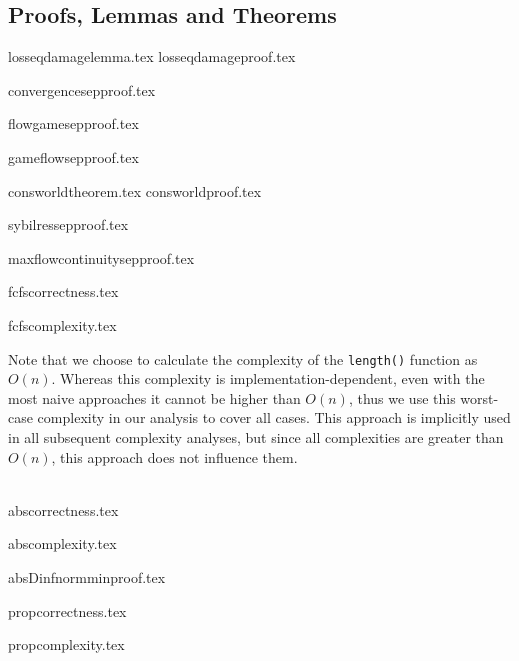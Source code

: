 \subsection{Proofs, Lemmas and Theorems}
{losseqdamagelemma.tex}
{losseqdamageproof.tex}

{convergencesepproof.tex}

{flowgamesepproof.tex}

{gameflowsepproof.tex}

{consworldtheorem.tex}
{consworldproof.tex}

{sybilressepproof.tex}

{maxflowcontinuitysepproof.tex}

{fcfscorrectness.tex}

{fcfscomplexity.tex}

Note that we choose to calculate the complexity of the \texttt{length()} function as $O\left(n\right)$. Whereas this
complexity is implementation-dependent, even with the most naive approaches it cannot be higher than $O\left(n\right)$,
thus we use this worst-case complexity in our analysis to cover all cases. This approach is implicitly used in all
subsequent complexity analyses, but since all complexities are greater than $O\left(n\right)$, this approach does not
influence them.

\ \\

{abscorrectness.tex}

{abscomplexity.tex}

{absDinfnormminproof.tex}

{propcorrectness.tex}

{propcomplexity.tex}
